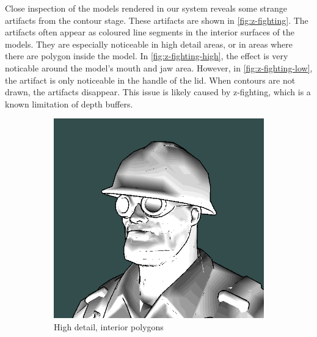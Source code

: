 Close inspection of the models rendered in our system reveals some strange artifacts from the contour stage. These 
artifacts are shown in \autoref{fig:z-fighting}. The artifacts often appear as coloured line segments in the interior 
surfaces of the models. They are especially noticeable in high detail areas, or in areas where there are polygon inside 
the model. In \autoref{fig:z-fighting-high}, the effect is very noticable around the model's mouth and jaw area. 
However, in \autoref{fig:z-fighting-low}, the artifact is only noticeable in the handle of the lid. When contours are 
not drawn, the artifacts disappear. This issue is likely caused by z-fighting, which is a known limitation of depth 
buffers.

\begin{figure}[h]
    \centering
    \begin{subfigure}[b]{0.35\textwidth}
        \includegraphics[width=\textwidth]{img/z-fighting-engineer}
        \caption{High detail, interior polygons}
        \label{fig:z-fighting-high}
    \end{subfigure}
    ~
    \begin{subfigure}[b]{0.35\textwidth}

\end{subfigure}
\end{figure}
